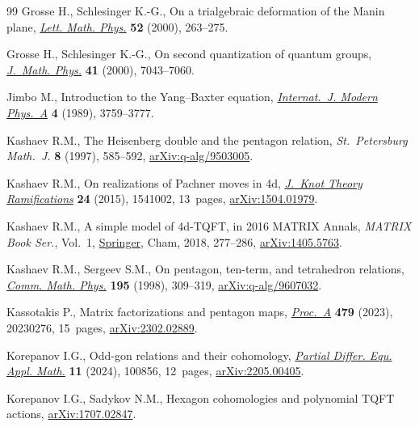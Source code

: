 \documentclass[10pt,a4paper]{amsart}
\numberwithin{equation}{section}
\theoremstyle{definition}
\begin{document}
\begin{thebibliography}{99}
Grosse H., Schlesinger K.-G., On a trialgebraic deformation of the {M}anin
 plane, \href{https://doi.org/10.1023/A:1007666919616}{\textit{Lett. Math.
 Phys.}} \textbf{52} (2000), 263--275.

Grosse H., Schlesinger K.-G., On second quantization of quantum groups,
 \href{https://doi.org/10.1063/1.1288798}{\textit{J.~Math. Phys.}} \textbf{41}
 (2000), 7043--7060.

Jimbo M., Introduction to the {Y}ang--{B}axter equation,
 \href{https://doi.org/10.1142/S0217751X89001503}{\textit{Internat.~J. Modern
 Phys.~A}} \textbf{4} (1989), 3759--3777.

Kashaev R.M., The {H}eisenberg double and the pentagon relation,
 \textit{St.~Petersburg Math.~J.} \textbf{8} (1997), 585--592,
 \href{https://arxiv.org/abs/q-alg/9503005}{arXiv:q-alg/9503005}.

Kashaev R.M., On realizations of {P}achner moves in 4d,
 \href{https://doi.org/10.1142/S0218216515410023}{\textit{J.~Knot Theory
 Ramifications}} \textbf{24} (2015), 1541002, 13~pages,
 \href{https://arxiv.org/abs/1504.01979}{arXiv:1504.01979}.

Kashaev R.M., A simple model of 4d-{TQFT}, in 2016 {MATRIX} Annals,
 \textit{MATRIX Book Ser.}, Vol.~1,
 \href{https://doi.org/10.1007/978-3-319-72299-3_14}{Springer}, Cham, 2018,
 277--286, \href{https://arxiv.org/abs/1405.5763}{arXiv:1405.5763}.

Kashaev R.M., Sergeev S.M., On pentagon, ten-term, and tetrahedron relations,
 \href{https://doi.org/10.1007/s002200050391}{\textit{Comm. Math. Phys.}}
 \textbf{195} (1998), 309--319,
 \href{https://arxiv.org/abs/q-alg/9607032}{arXiv:q-alg/9607032}.

Kassotakis P., Matrix factorizations and pentagon maps,
 \href{https://doi.org/10.1098/rspa.2023.0276}{\textit{Proc.~A}} \textbf{479}
 (2023), 20230276, 15~pages,
 \href{https://arxiv.org/abs/2302.02889}{arXiv:2302.02889}.

Korepanov I.G., Odd-gon relations and their cohomology, \href{https://doi.org/10.1016/j.padiff.2024.100856}{\textit{Partial Differ. Equ. Appl. Math.}} \textbf{11} (2024), 100856, 12~pages,
 \href{https://arxiv.org/abs/2205.00405}{arXiv:2205.00405}.

Korepanov I.G., Sadykov N.M., Hexagon cohomologies and polynomial {TQFT}
 actions, \href{https://arxiv.org/abs/1707.02847}{arXiv:1707.02847}.


\end{thebibliography}
\end{document}
